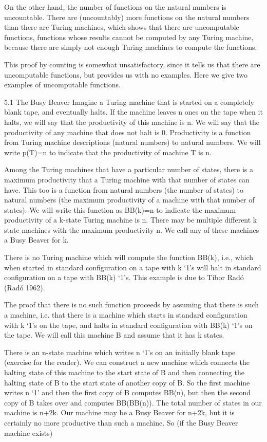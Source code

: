 On the other hand, the number of functions on the natural numbers is uncountable. There are (uncountably) more functions on the natural numbers than there are Turing machines, which shows that there are uncomputable functions, functions whose results cannot be computed by any Turing machine, because there are simply not enough Turing machines to compute the functions.

This proof by counting is somewhat unsatisfactory, since it tells us that there are uncomputable functions, but provides us with no examples. Here we give two examples of uncomputable functions.

5.1 The Busy Beaver
Imagine a Turing machine that is started on a completely blank tape, and eventually halts. If the machine leaves n ones on the tape when it halts, we will say that the productivity of this machine is n. We will say that the productivity of any machine that does not halt is 0. Productivity is a function from Turing machine descriptions (natural numbers) to natural numbers. We will write p(T)=n to indicate that the productivity of machine T is n.

Among the Turing machines that have a particular number of states, there is a maximum productivity that a Turing machine with that number of states can have. This too is a function from natural numbers (the number of states) to natural numbers (the maximum productivity of a machine with that number of states). We will write this function as BB(k)=n to indicate the maximum productivity of a k-state Turing machine is n. There may be multiple different k state machines with the maximum productivity n. We call any of these machines a Busy Beaver for k.

There is no Turing machine which will compute the function BB(k), i.e., which when started in standard configuration on a tape with k ‘1’s will halt in standard configuration on a tape with BB(k) ‘1’s. This example is due to Tibor Radó (Radó 1962).

The proof that there is no such function proceeds by assuming that there is such a machine, i.e. that there is a machine which starts in standard configuration with k ‘1’s on the tape, and halts in standard configuration with BB(k) ‘1’s on the tape. We will call this machine B and assume that it has k states.

There is an n-state machine which writes n ‘1’s on an initially blank tape (exercise for the reader). We can construct a new machine which connects the halting state of this machine to the start state of B and then connecting the halting state of B to the start state of another copy of B. So the first machine writes n ‘1’ and then the first copy of B computes BB(n), but then the second copy of B takes over and computes BB(BB(n)). The total number of states in our machine is n+2k. Our machine may be a Busy Beaver for n+2k, but it is certainly no more productive than such a machine. So (if the Busy Beaver machine exists)

